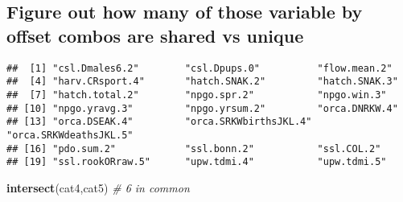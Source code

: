 \documentclass[]{article}
\newenvironment{Shaded}{\begin{snugshade}}{\end{snugshade}}
\newcommand{\KeywordTok}[1]{\textcolor[rgb]{0.13,0.29,0.53}{\textbf{{#1}}}}
\newcommand{\DecValTok}[1]{\textcolor[rgb]{0.00,0.00,0.81}{{#1}}}
\newcommand{\StringTok}[1]{\textcolor[rgb]{0.31,0.60,0.02}{{#1}}}
\newcommand{\CommentTok}[1]{\textcolor[rgb]{0.56,0.35,0.01}{\textit{{#1}}}}
\newcommand{\NormalTok}[1]{{#1}}
\begin{document}
\begin{Shaded}
\end{Shaded}

\subsection{Figure out how many of those variable by offset combos are
shared vs
unique}\label{figure-out-how-many-of-those-variable-by-offset-combos-are-shared-vs-unique}

\begin{Shaded}
\end{Shaded}

\begin{verbatim}
##  [1] "csl.Dmales6.2"        "csl.Dpups.0"          "flow.mean.2"         
##  [4] "harv.CRsport.4"       "hatch.SNAK.2"         "hatch.SNAK.3"        
##  [7] "hatch.total.2"        "npgo.spr.2"           "npgo.win.3"          
## [10] "npgo.yravg.3"         "npgo.yrsum.2"         "orca.DNRKW.4"        
## [13] "orca.DSEAK.4"         "orca.SRKWbirthsJKL.4" "orca.SRKWdeathsJKL.5"
## [16] "pdo.sum.2"            "ssl.bonn.2"           "ssl.COL.2"           
## [19] "ssl.rookORraw.5"      "upw.tdmi.4"           "upw.tdmi.5"
\end{verbatim}

\begin{Shaded}
\begin{Highlighting}[]
\KeywordTok{intersect}\NormalTok{(cat4,cat5) }\CommentTok{# 6 in common}
\end{Highlighting}
\end{Shaded}
\end{document}
